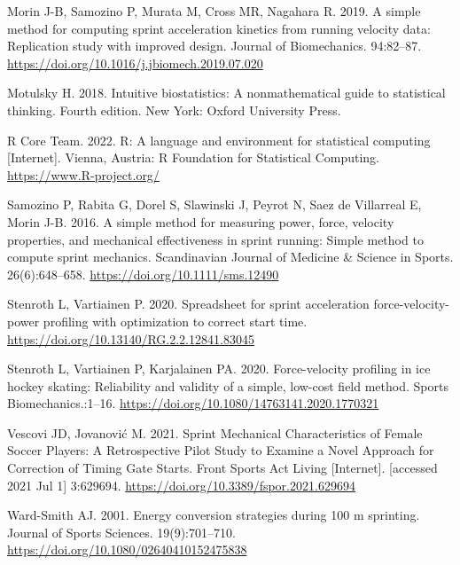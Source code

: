\documentclass[
  letterpaper,
  DIV=11,
  numbers=noendperiod]{scrartcl}
\newlength{\cslhangindent}
\newlength{\cslentryspacingunit} %
\newenvironment{CSLReferences}[2] %
 {%
  \setlength{\parindent}{0pt}
  \ifodd #1
  \let\oldpar\par
  \def\par{\hangindent=\cslhangindent\oldpar}
  \fi
  \setlength{\parskip}{#2\cslentryspacingunit}
 }%
 {}
\begin{document}
\begin{CSLReferences}{0}{0}
\leavevmode{}%
Morin J-B, Samozino P, Murata M, Cross MR, Nagahara R. 2019. A simple
method for computing sprint acceleration kinetics from running velocity
data: {Replication} study with improved design. Journal of Biomechanics.
94:82--87. \url{https://doi.org/10.1016/j.jbiomech.2019.07.020}

\leavevmode{}%
Motulsky H. 2018. Intuitive biostatistics: A nonmathematical guide to
statistical thinking. Fourth edition. {New York}: {Oxford University
Press}.

\leavevmode{}%
R Core Team. 2022. R: A language and environment for statistical
computing {[}Internet{]}. Vienna, Austria: R Foundation for Statistical
Computing. \url{https://www.R-project.org/}

\leavevmode{}%
Samozino P, Rabita G, Dorel S, Slawinski J, Peyrot N, Saez de Villarreal
E, Morin J-B. 2016. A simple method for measuring power, force, velocity
properties, and mechanical effectiveness in sprint running: {Simple}
method to compute sprint mechanics. Scandinavian Journal of Medicine \&
Science in Sports. 26(6):648--658.
\url{https://doi.org/10.1111/sms.12490}

\leavevmode{}%
Stenroth L, Vartiainen P. 2020. Spreadsheet for sprint acceleration
force-velocity-power profiling with optimization to correct start time.
\url{https://doi.org/10.13140/RG.2.2.12841.83045}

\leavevmode{}%
Stenroth L, Vartiainen P, Karjalainen PA. 2020. Force-velocity profiling
in ice hockey skating: Reliability and validity of a simple, low-cost
field method. Sports Biomechanics.:1--16.
\url{https://doi.org/10.1080/14763141.2020.1770321}

\leavevmode{}%
Vescovi JD, Jovanović M. 2021. Sprint {Mechanical Characteristics} of
{Female Soccer Players}: {A Retrospective Pilot Study} to {Examine} a
{Novel Approach} for {Correction} of {Timing Gate Starts}. Front Sports
Act Living {[}Internet{]}. {[}accessed 2021 Jul 1{]} 3:629694.
\url{https://doi.org/10.3389/fspor.2021.629694}

\leavevmode{}%
Ward-Smith AJ. 2001. Energy conversion strategies during 100 m
sprinting. Journal of Sports Sciences. 19(9):701--710.
\url{https://doi.org/10.1080/02640410152475838}

\end{CSLReferences}
\end{document}

